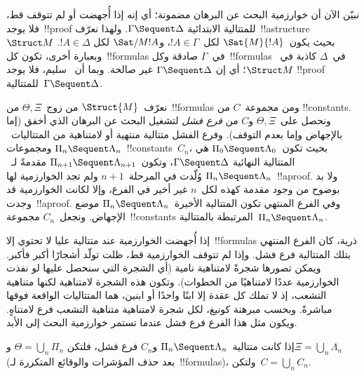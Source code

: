 \documentclass[../../../include/open-logic-section]{subfiles}
\begin{document}


نبيّن الآن أن خوارزمية البحث عن البرهان مضمونة؛ أي إنه إذا أُجهضت أو لم
تتوقف قط، فلا يوجد~!!{proof} للمتتالية الابتدائية
$\Gamma \Sequent \Delta$. ولهذا نعرّف~!!a{structure}~$\Struct M$ بحيث
يكون~$\Sat{M}{!A}$ لكل~$!A \in \Gamma$، و$\Sat/{M}{!A}$ لكل
$!A \in \Delta$. وبعبارة أخرى، تكون كل~!!{formula}s في~$\Gamma$ صادقة
وكل~!!{formula}s في~$\Delta$ كاذبة في~$\Struct M$؛ أي إن
$\Gamma \Sequent \Delta$ غير صالحة. وبما أن~ سليم، فلا يوجد
!!{proof} للمتتالية~$\Gamma \Sequent \Delta$.

نعرّف~$\Struct{M}$ من زوج~$\Theta,\Xi$ من~!!{formula}s ومن مجموعة~$C$ من
!!{constant}s. ونحصل على~$\Theta,\Xi$ و$C$ من \emph{فرع فشل} لتشغيل البحث
عن البرهان الذي أخفق (إما بالإجهاض وإما بعدم التوقف). وفرع الفشل متتالية
منتهية أو لامتناهية من المتتاليات~$\Pi_n \Sequent \Lambda_n$
ومجموعات~!!{constant}s~$C_n$، بحيث
تكون~$\Pi_0 \Sequent \Lambda_0$ هي المتتالية النهائية
$\Gamma \Sequent \Delta$، وتكون~$\Pi_{n+1} \Sequent \Lambda_{n+1}$ مقدمةً
لـ~$\Pi_n \Sequent \Lambda_n$ وُلّدت في المرحلة~$n+1$ ولم تجد الخوارزمية
لها~!!a{proof}. ولا بد بوضوح من وجود مقدمة كهذه لكل~$n$ غير أخير في
الفرع، وإلا لكانت الخوارزمية قد وجدت~!!a{proof}. وفي الفرع المنتهي تكون
المتتالية الأخيرة~$\Pi_n \Sequent \Lambda_n$ موضع الإجهاض. ونجعل~$C_n$
مجموعة~!!{constant}s المرتبطة بالمتتالية~$\Pi_n \Sequent \Lambda_n$.

إذا أُجهضت الخوارزمية عند متتالية عليا لا تحتوي إلا~!!{formula}s ذرية، كان
الفرع المنتهي بتلك المتتالية فرع فشل. وإذا لم تتوقف الخوارزمية قط، ظلت تولّد
أشجارًا أكبر فأكبر. ويمكن تصورها شجرةً لامتناهية نامية (أي الشجرة التي
سنحصل عليها لو نفذت الخوارزمية عددًا لامتناهيًا من الخطوات). وتكون هذه
الشجرة لامتناهية لكنها متناهية التشعب، إذ لا تملك كل عقدة إلا ابنًا واحدًا
أو ابنين، هما المتتاليات الواقعة فوقها مباشرةً. وبحسب مبرهنة كونيغ، لكل شجرة
لامتناهية متناهية التشعب فرع لامتناهٍ. ويكون مثل هذا الفرع فرع فشل عندما
تستمر خوارزمية البحث إلى الأبد.

إذا كانت متتالية~$\Pi_n \Sequent \Lambda_n$ و$C_n$ فرع فشل، فلتكن
$\Theta=\bigcup_n\Pi_n$ و$\Xi=\bigcup_n\Lambda_n$ (بعد حذف المؤشرات
والوقائع المتكررة لـ~!!{formula}s)، ولتكن~$C=\bigcup_n C_n$.
\end{document}
